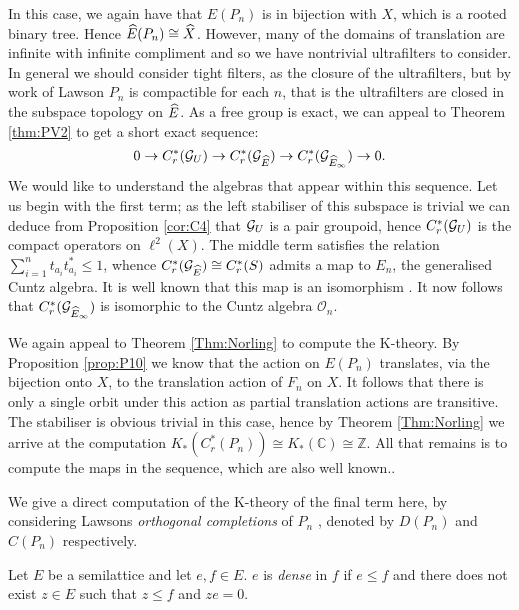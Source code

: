 \begin{example}
\begin{example}
In this case, we again have that $E(P_{n})$ is in bijection with $X$, which is a rooted binary tree. Hence $\widehat{E}(P_{n}) \cong \widehat{X}$. However, many of the domains of translation are infinite with infinite compliment and so we have nontrivial ultrafilters to consider. In general we should consider tight filters, as the closure of the ultrafilters, but by work of Lawson \cite{lawson-2011-1} $P_{n}$ is compactible for each $n$, that is the ultrafilters are closed in the subspace topology on $\widehat{E}$. As a free group is exact, we can appeal to Theorem \ref{thm:PV2} to get a short exact sequence:
\begin{equation*}
0 \rightarrow C^{*}_{r}(\mathcal{G}_{U}) \rightarrow C^{*}_{r}(\mathcal{G}_{\widehat{E}}) \rightarrow C^{*}_{r}(\mathcal{G}_{\widehat{E}_{\infty}}) \rightarrow 0.
\end{equation*}
We would like to understand the algebras that appear within this sequence. Let us begin with the first term; as the left stabiliser of this subspace is trivial we can deduce from Proposition \ref{cor:C4} that $\mathcal{G}_{U}$ is a pair groupoid, hence $C^{*}_{r}(\mathcal{G}_{U})$ is the compact operators on $\ell^{2}(X)$. The middle term satisfies the relation $\sum_{i=1}^{n}t_{a_{i}}t_{a_{i}}^{*} \leq 1$, whence $C^{*}_{r}(\mathcal{G}_{\widehat{E}}) \cong C^{*}_{r}(S)$ admits a map to $E_{n}$, the generalised Cuntz algebra. It is well known that this map is an isomorphism \cite{MR1724106,MR584266}. It now follows that $C^{*}_{r}(\mathcal{G}_{\widehat{E}_{\infty}})$ is isomorphic to the Cuntz algebra $\mathcal{O}_{n}$.

We again appeal to Theorem \ref{Thm:Norling} to compute the K-theory. By Proposition \ref{prop:P10} we know that the action on $E(P_{n})$ translates, via the bijection onto $X$, to the translation action of $F_{n}$ on $X$. It follows that there is only a single orbit under this action as partial translation actions are transitive. The stabiliser is obvious trivial in this case, hence by Theorem \ref{Thm:Norling} we arrive at the computation $K_{*}(C^{*}_{r}(P_{n})) \cong K_{*}(\mathbb{C})\cong \mathbb{Z}$. All that remains is to compute the maps in the sequence, which are also well known..

We give a direct computation of the K-theory of the final term here, by considering Lawsons \textit{orthogonal completions} of $P_{n}$ \cite{lawson-2011-1}, denoted by $D(P_{n})$ and $C(P_{n})$ respectively.

\begin{definition}
Let $E$ be a semilattice and let $e,f \in E$. $e$ is \textit{dense} in $f$ if $e \leq f$ and there does not exist $z \in E$ such that $z \leq f$ and $ze=0$. 
\end{definition}


\end{example}
\end{example}
